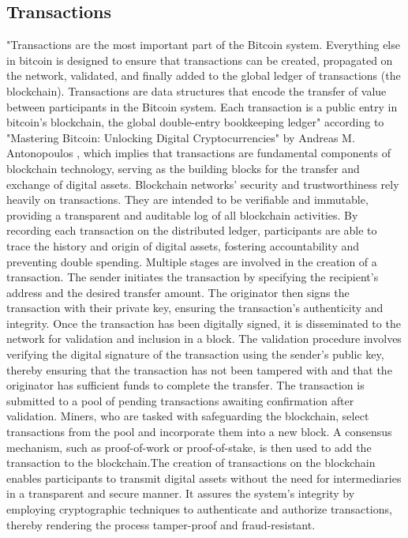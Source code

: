 \documentclass[../../Main.tex]{subfiles}
\begin{document}
\subsection{Transactions}
\label{section:2.1.1}
"Transactions are the most important part of the Bitcoin system. Everything else in bitcoin is designed to ensure that transactions can be created, propagated on the network, validated, and finally added to the global ledger of transactions (the blockchain). Transactions are data structures that encode the transfer of value between participants in the Bitcoin system. Each transaction is a public entry in bitcoin’s blockchain, the global double-entry bookkeeping ledger" according to "Mastering Bitcoin: Unlocking Digital Cryptocurrencies" by Andreas M. Antonopoulos \cite{antonopoulos2014masteringbitcoin}, which implies that transactions are fundamental components of blockchain technology, serving as the building blocks for the transfer and exchange of digital assets. Blockchain networks' security and trustworthiness rely heavily on transactions. They are intended to be verifiable and immutable, providing a transparent and auditable log of all blockchain activities. By recording each transaction on the distributed ledger, participants are able to trace the history and origin of digital assets, fostering accountability and preventing double spending. Multiple stages are involved in the creation of a transaction. The sender initiates the transaction by specifying the recipient's address and the desired transfer amount. The originator then signs the transaction with their private key, ensuring the transaction's authenticity and integrity. Once the transaction has been digitally signed, it is disseminated to the network for validation and inclusion in a block. The validation procedure involves verifying the digital signature of the transaction using the sender's public key, thereby ensuring that the transaction has not been tampered with and that the originator has sufficient funds to complete the transfer. The transaction is submitted to a pool of pending transactions awaiting confirmation after validation. Miners, who are tasked with safeguarding the blockchain, select transactions from the pool and incorporate them into a new block. A consensus mechanism, such as proof-of-work or proof-of-stake, is then used to add the transaction to the blockchain.The creation of transactions on the blockchain enables participants to transmit digital assets without the need for intermediaries in a transparent and secure manner. It assures the system's integrity by employing cryptographic techniques to authenticate and authorize transactions, thereby rendering the process tamper-proof and fraud-resistant.
\end{document}
